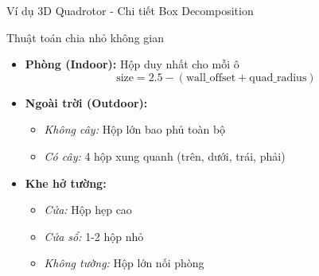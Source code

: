 \documentclass[aspectratio=169]{beamer}
\begin{document}
\begin{frame}{Ví dụ 3D Quadrotor - Chi tiết Box Decomposition}

    \begin{block}{Thuật toán chia nhỏ không gian}
        \begin{itemize}
            \item \textbf{Phòng (Indoor):} Hộp duy nhất cho mỗi ô
                  \[
                      \text{size} = 2.5 - (\text{wall\_offset} + \text{quad\_radius})
                  \]

            \item \textbf{Ngoài trời (Outdoor):}
                  \begin{itemize}
                      \item \textit{Không cây:} Hộp lớn bao phủ toàn bộ
                      \item \textit{Có cây:} 4 hộp xung quanh (trên, dưới, trái, phải)
                  \end{itemize}

            \item \textbf{Khe hở tường:}
                  \begin{itemize}
                      \item \textit{Cửa:} Hộp hẹp cao
                      \item \textit{Cửa sổ:} 1-2 hộp nhỏ  
                      \item \textit{Không tường:} Hộp lớn nối phòng
                  \end{itemize}
        \end{itemize}
    \end{block}

\end{frame}
\end{document}
